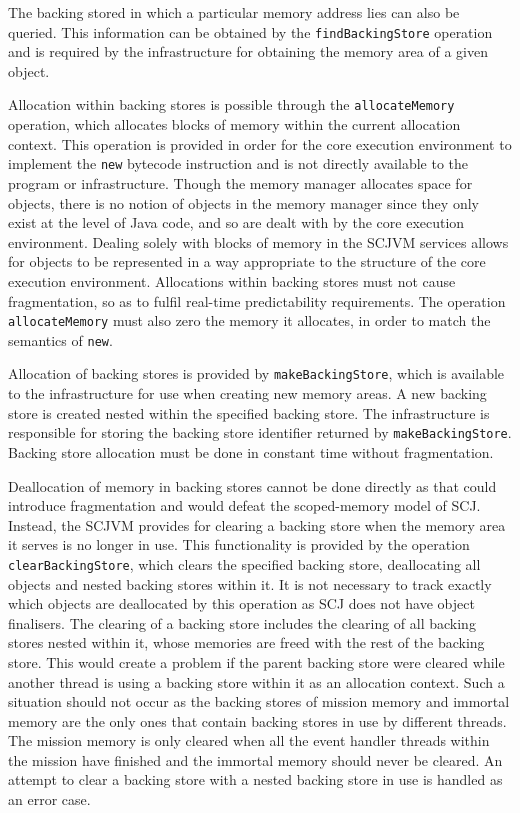 The backing stored in which a particular memory address lies can also
be queried.  
This information can be obtained by the \texttt{find\-Backing\-Store}
operation and is required by the infrastructure for obtaining the
memory area of a given object.

Allocation within backing stores is possible through the
\texttt{allocate\-Memory} operation, which allocates blocks of memory
within the current allocation context.
This operation is provided in order for the core execution environment
to implement the \texttt{new} bytecode instruction and is not directly
available to the program or infrastructure.
Though the memory manager allocates space for objects, there is no
notion of objects in the memory manager since they only exist at the
level of Java code, and so are dealt with by the core execution
environment. 
Dealing solely with blocks of memory in the SCJVM services allows for
objects to be represented in a way appropriate to the structure of the
core execution environment.
Allocations within backing stores must not cause fragmentation, so as
to fulfil real-time predictability requirements.
The operation \texttt{allocate\-Memory} must also zero the memory it
allocates, in order to match the semantics of \texttt{new}.
 
Allocation of backing stores is provided by
\texttt{make\-Backing\-Store}, which is available to the
infrastructure for use when creating new memory areas.
A new backing store is created nested within the specified backing
store.
The infrastructure is responsible for storing the backing store
identifier returned by \texttt{make\-Backing\-Store}.
Backing store allocation must be done in constant time without
fragmentation.

Deallocation of memory in backing stores cannot be done directly as
that could introduce fragmentation and would defeat the scoped-memory
model of SCJ.
Instead, the SCJVM provides for clearing a backing store when the
memory area it serves is no longer in use.
This functionality is provided by the operation
\texttt{clear\-Backing\-Store}, which clears the specified backing
store, deallocating all objects and nested backing stores within it.
It is not necessary to track exactly which objects are deallocated by
this operation as SCJ does not have object finalisers.
The clearing of a backing store includes the clearing of all backing
stores nested within it, whose memories are freed with the rest of the
backing store.
This would create a problem if the parent backing store were cleared
while another thread is using a backing store within it as an
allocation context.
Such a situation should not occur as the backing stores of mission
memory and immortal memory are the only ones that contain backing
stores in use by different threads.
The mission memory is only cleared when all the event handler threads
within the mission have finished and the immortal memory should never
be cleared.
An attempt to clear a backing store with a nested backing store in use
is handled as an error case.


